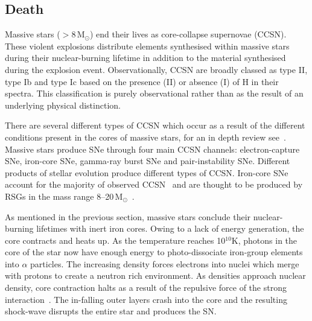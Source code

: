 
\subsection{Death} %
\label{sub:death}

Massive stars ($>$8\,M$_{\odot}$) end their lives as core-collapse supernovae (CCSN).
These violent explosions distribute elements synthesised within massive stars during their nuclear-burning lifetime in addition to the material synthesised during the explosion event.
Observationally, CCSN are broadly classed as type II, type Ib and type Ic based on the presence (II) or absence (I) of H in their spectra.\footnotemark
This classification is purely observational rather than as the result of an underlying physical distinction.


There are several different types of CCSN which occur as a result of the different conditions present in the cores of massive stars, for an in depth review see~\cite{Janka12}.
Massive stars produce SNe through four main CCSN channels: electron-capture SNe, iron-core SNe, gamma-ray burst SNe and pair-instability SNe.
Different products of stellar evolution produce different types of CCSN.
Iron-core SNe account for the majority of observed CCSN~\citep{Smartt09,Janka12,Eldridge13,2014ARA&A..52..487S} and are thought to be produced by RSGs in the mass range 8--20\,M$_{\odot}$~\citep{Poelarends08,Smartt09}.


As mentioned in the previous section, massive stars conclude their nuclear-burning lifetimes with inert iron cores.
Owing to a lack of energy generation, the core contracts and heats up.
As the temperature reaches 10$^{10}$K, photons in the core of the star now have enough energy to photo-dissociate iron-group elements into $\alpha$ particles.
The increasing density forces electrons into nuclei which merge with protons to create a neutron rich environment.
As densities approach nuclear density, core contraction halts as a result of the repulsive force of the strong interaction~\citep{Janka12}.
The in-falling outer layers crash into the core and the resulting shock-wave disrupts the entire star and produces the SN.

